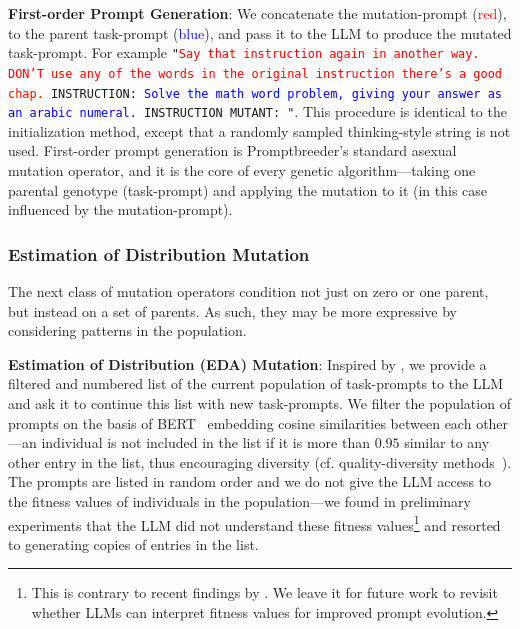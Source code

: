 \documentclass{article} %
\newcommand{\prompt}[1]{\footnotesize{\texttt{"#1"}}\normalsize}
\begin{document}
\textbf{First-order Prompt Generation}: We concatenate the mutation-prompt (\textcolor{red}{red}), to the parent task-prompt (\textcolor{blue}{blue}), and pass it to the LLM to produce the mutated task-prompt. For example \prompt{\textcolor{red}{Say that instruction again in another way.  DON’T use any of the words in the original instruction there's a good chap.} INSTRUCTION: \textcolor{blue}{Solve the math word problem, giving your answer as an arabic numeral.} INSTRUCTION MUTANT: }. This procedure is identical to the initialization method, except that a randomly sampled thinking-style string is not used. First-order prompt generation is Promptbreeder's standard asexual mutation operator, and it is the core of every genetic algorithm---taking one parental genotype (task-prompt) and applying the mutation to it (in this case influenced by the mutation-prompt). 

\subsubsection{Estimation of Distribution Mutation}
The next class of mutation operators condition not just on zero or one parent, but instead on a set of parents. As such, they may be more expressive by considering patterns in the population.

\textbf{Estimation of Distribution (EDA) Mutation}: Inspired by \cite{hauschild2011introduction}, we provide a filtered and numbered list of the current population of task-prompts to the LLM and ask it to continue this list with new task-prompts. 
We filter the population of prompts on the basis of BERT~\citep{DBLP:conf/naacl/DevlinCLT19} embedding cosine similarities between each other---an individual is not included in the list if it is more than $0.95$ similar to any other entry in the list, thus encouraging diversity (cf. quality-diversity methods~\citep{lehman2011abandoning,DBLP:conf/gecco/LehmanS11,DBLP:journals/corr/MouretC15}). The prompts are listed in random order and we do not give the LLM access to the fitness values of individuals in the population---we found in preliminary experiments that the LLM did not understand these fitness values\footnote{This is contrary to recent findings by \cite{DBLP:journals/corr/abs-2307-04721}. We leave it for future work to revisit whether LLMs can interpret fitness values for improved prompt evolution.} and resorted to generating copies of entries in the list. 
\end{document}
